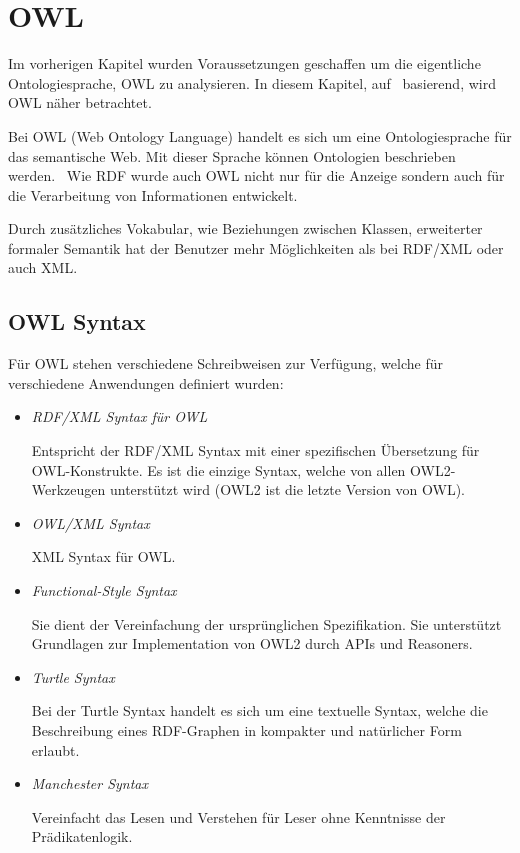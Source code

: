 \chapter{OWL}
\label{chap:owl}

Im vorherigen Kapitel wurden Voraussetzungen geschaffen um die eigentliche Ontologiesprache, OWL zu analysieren. In diesem Kapitel, auf~\cite{w3owl} basierend, wird OWL näher betrachtet.

Bei OWL (Web Ontology Language) handelt es sich um eine Ontologiesprache für das semantische Web. Mit dieser Sprache können Ontologien beschrieben werden.~\cite{cambSemOWL} Wie RDF wurde auch OWL nicht nur für die Anzeige sondern auch für die Verarbeitung von Informationen entwickelt.

Durch zusätzliches Vokabular, wie Beziehungen zwischen Klassen, erweiterter formaler Semantik hat der Benutzer mehr Möglichkeiten als bei RDF/XML oder auch XML.\@

\section{OWL Syntax}
\label{sec:owl_owl_syntax}
Für OWL stehen verschiedene Schreibweisen zur Verfügung, welche für verschiedene Anwendungen definiert wurden:
\begin{itemize}
	\item \textit{RDF/XML Syntax für OWL}

        Entspricht der RDF/XML Syntax mit einer spezifischen Übersetzung für OWL-Konstrukte. Es ist die einzige Syntax, welche von allen OWL2-Werkzeugen unterstützt wird (OWL2 ist die letzte Version von OWL).
	\item \textit{OWL/XML Syntax}

        XML Syntax für OWL.\@
	\item \textit{Functional-Style Syntax}

        Sie dient der Vereinfachung der ursprünglichen Spezifikation. Sie unterstützt Grundlagen zur Implementation von OWL2 durch APIs und Reasoners.
	\item \textit{Turtle Syntax}

        Bei der Turtle Syntax handelt es sich um eine textuelle Syntax, welche die Beschreibung eines RDF-Graphen in kompakter und natürlicher Form erlaubt.

	\item \textit{Manchester Syntax}

        Vereinfacht das Lesen und Verstehen für Leser ohne Kenntnisse der Prädikatenlogik.
\end{itemize}

